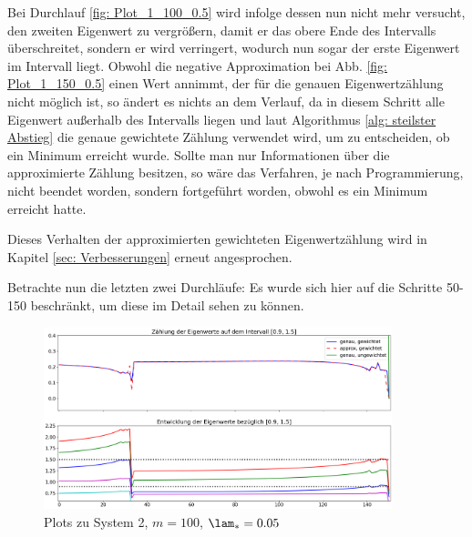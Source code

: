 \documentclass[a4paper,12pt]{report}
\newcommand{\1}{\mathds{1}}
\theoremstyle{plain} %
\theoremstyle{definition} %
\theoremstyle{remark}
\begin{document}
            Bei Durchlauf \ref{fig: Plot_1_100_0.5} wird infolge dessen nun nicht mehr versucht, den zweiten Eigenwert zu vergrößern, damit er das obere Ende des Intervalls überschreitet, sondern er wird verringert, wodurch nun sogar der erste Eigenwert im Intervall liegt.
            Obwohl die negative Approximation bei Abb. \ref{fig: Plot_1_150_0.5} einen Wert annimmt, der für die genauen Eigenwertzählung nicht möglich ist, so ändert es nichts an dem Verlauf, da in diesem Schritt alle Eigenwert außerhalb des Intervalls liegen und laut Algorithmus \ref{alg: steilster Abstieg} die genaue gewichtete Zählung verwendet wird, um zu entscheiden, ob ein Minimum erreicht wurde.
            Sollte man nur Informationen über die approximierte Zählung besitzen, so wäre das Verfahren, je nach Programmierung, nicht beendet worden, sondern fortgeführt worden, obwohl es ein Minimum erreicht hatte.

            Dieses Verhalten der approximierten gewichteten Eigenwertzählung wird in Kapitel \ref{sec: Verbesserungen} erneut angesprochen.

            Betrachte nun die letzten zwei Durchläufe:
            Es wurde sich hier auf die Schritte 50-150 beschränkt, um diese im Detail sehen zu können.

            \begin{figure}[ht]
                  \centering
                  \includegraphics[width=0.9\textwidth, keepaspectratio]{./Original/Plot_2_100_0.05.png}
                  \caption{Plots zu System 2, $m=100$, $\lam_*=0.05$}
                  \label{fig: Plot_2_100_0.05}
            \end{figure}
\end{document}
